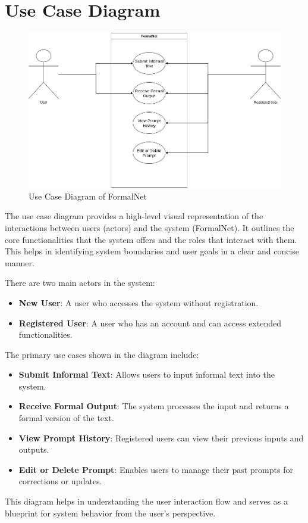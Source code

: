 \section{Use Case Diagram}
\begin{figure}[H]
  \centering
  \includegraphics[width=1\textwidth]{images/usecasediagram.png}
  \caption{Use Case Diagram of FormalNet}
  \label{fig:usecase}
\end{figure}
The use case diagram provides a high-level visual representation of the interactions between users (actors) and the system (FormalNet). It outlines the core functionalities that the system offers and the roles that interact with them. This helps in identifying system boundaries and user goals in a clear and concise manner.

There are two main actors in the system:
\begin{itemize}
    \item \textbf{New User}: A user who accesses the system without registration.
    \item \textbf{Registered User}: A user who has an account and can access extended functionalities.
\end{itemize}
The primary use cases shown in the diagram include:
\begin{itemize}
    \item \textbf{Submit Informal Text}: Allows users to input informal text into the system.
    \item \textbf{Receive Formal Output}: The system processes the input and returns a formal version of the text.
    \item \textbf{View Prompt History}: Registered users can view their previous inputs and outputs.
    \item \textbf{Edit or Delete Prompt}: Enables users to manage their past prompts for corrections or updates.
\end{itemize}
This diagram helps in understanding the user interaction flow and serves as a blueprint for system behavior from the user's perspective.

